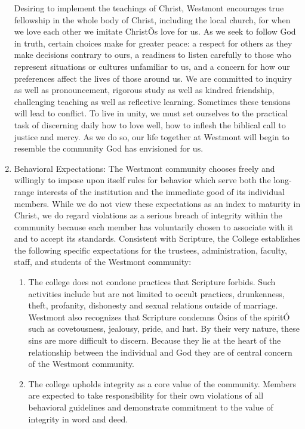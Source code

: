 \documentclass[letterpaper, 11pt]{article}
\begin{document}
\begin{enumerate}[label=\alph*)]
{						Desiring to implement the teachings of Christ, Westmont encourages true fellowship in the whole body of Christ, including the local church, for when we love each other we imitate ChristÕs love for us.  As we seek to follow God in truth, certain choices make for greater peace:  a respect for others as they make decisions contrary to ours, a readiness to listen carefully to those who represent situations or cultures unfamiliar to us, and a concern for how our preferences affect the lives of those around us.
						We are committed to inquiry as well as pronouncement, rigorous study as well as kindred friendship, challenging teaching as well as reflective learning.   Sometimes these tensions will lead to conflict.  To live in unity, we must set ourselves to the practical task of discerning daily how to love well, how to inflesh the biblical call to justice and mercy.  As we do so, our life together at Westmont will begin to resemble the community God has envisioned for us.
					}
					\item{Behavioral Expectations:
						The Westmont community chooses freely and willingly to impose upon itself rules for behavior which serve both the long-range interests of the institution and the immediate good of its individual members.  While we do not view these expectations as an index to maturity in Christ, we do regard violations as a serious breach of integrity within the community because each member has voluntarily chosen to associate with it and to accept its standards.
						Consistent with Scripture, the College establishes the following specific expectations for the trustees, administration, faculty, staff, and students of the Westmont community:
						\begin{enumerate}[label=\arabic*)]
							\item{The college does not condone practices that Scripture forbids.  Such activities include but are not limited to occult practices, drunkenness, theft, profanity, dishonesty and sexual relations outside of marriage.  Westmont also recognizes that Scripture condemns Òsins of the spiritÓ such as covetousness, jealousy, pride, and lust.  By their very nature, these sins are more difficult to discern.  Because they lie at the heart of the relationship between the individual and God they are of central concern of the Westmont community.}
							\item{The college upholds integrity as a core value of the community.  Members are expected to take responsibility for their own violations of all behavioral guidelines and demonstrate commitment to the value of integrity in word and deed.}

\end{enumerate}}
\end{enumerate}
\end{document}
